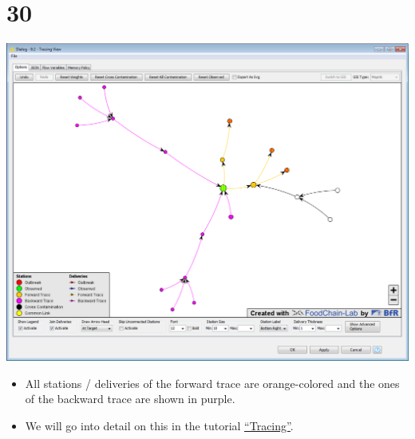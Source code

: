 \documentclass[10pt]{beamer}
\begin{document}
\section{30}
\begin{frame}
	\begin{center}
  		\includegraphics[height=0.6\textheight]{30.png}
	\end{center}
	\begin{itemize}
		\item All stations / deliveries of the forward trace are orange-colored and the ones of the backward trace are shown in purple.
		\item We will go into detail on this in the tutorial \textcolor{blue}{\underline{\href{https://foodrisklabs.bfr.bund.de/en_tracing/}{``Tracing''}}}.
	\end{itemize}
\end{frame}
\end{document}
